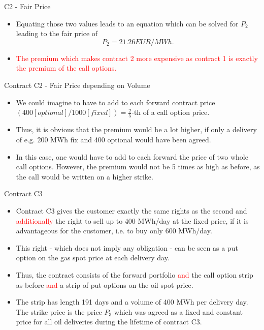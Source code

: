 {C2 - Fair Price}
\begin{itemize}
\item<1->
Equating those two values leads to an equation which can be solved for $P_2$ leading to the fair price of
$$
	P_2 = 21.26 EUR/MWh.
$$
\item<2->
\textcolor{red}{The premium which makes contract 2 more expensive as contract 1 is exactly the premium of the call options.}
\end{itemize}

{Contract C2 - Fair Price depending on Volume}
\begin{itemize}
\item<1-> We could imagine to have to add to each forward contract price $(400 [optional]/1000 [fixed]) = \frac 2 5$-th of a call option price.
\item<2-> Thus, it is obvious that the premium would be a lot higher, if only a delivery of e.g. 200 MWh fix and 400 optional would have been agreed.
\item<3-> In this case, one would have to add to each forward the price of two whole call options. However, the premium would not be 5 times as high as before, as the call would be written on a higher strike.
\end{itemize}


{Contract C3}
\begin{itemize}
\item<1-> Contract C3 gives the customer exactly the same rights as the second and \textcolor{red}{additionally} the right to sell up to 400 MWh/day at the fixed price, if it is advantageous for the customer, i.e. to buy only 600 MWh/day.
\item<2-> This right - which does not imply any obligation - can be seen as a put option on the gas spot price at each delivery day.
\item<3-> Thus, the contract consists of the forward portfolio \textcolor{red}{and} the call option strip as before \textcolor{red}{and} a strip of put options on the oil spot price.
\item<4-> The strip has length 191 days and a volume of 400 MWh per delivery day. The strike price is the price $P_3$ which was agreed as a fixed and constant price for all oil deliveries during the lifetime of contract C3.
\end{itemize}

